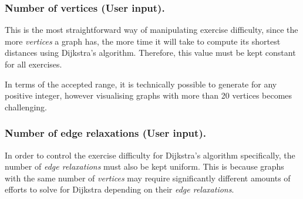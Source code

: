 \documentclass{l4proj}
\begin{document}
\subsubsection{Number of vertices (User input).}
\label{sec:nov}

This is the most straightforward way of manipulating exercise difficulty, since the more \emph{vertices} a graph has, the more time it will take to compute its shortest distances using Dijkstra's algorithm. Therefore, this value must be kept constant for all exercises. 

In terms of the accepted range, it is technically possible to generate for any positive integer, however visualising graphs with more than 20 vertices becomes challenging.

\subsubsection{Number of edge relaxations (User input).}
\label{sec:ernum}

In order to control the exercise difficulty for Dijkstra's algorithm specifically, the number of \emph{edge relaxations} must also be kept uniform. This is because graphs with the same number of \emph{vertices} may require significantly different amounts of efforts to solve for Dijkstra depending on their \emph{edge relaxations}. 
\end{document}
